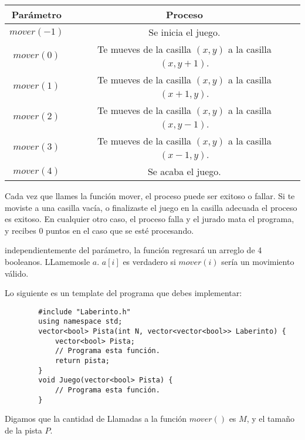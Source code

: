 \documentclass[12pt]{scrartcl}
\begin{document}
    \begin{center}
        \begin{tabular}{|c|c|}
            \hline
            {\bfseries Parámetro} & {\bfseries Proceso}\\
            \hline
             $mover(-1)$ & Se inicia el juego. \\
             \hline
             $mover(0)$ &  Te mueves de la casilla $(x, y)$ a la casilla $(x, y + 1)$. \\
             \hline
             $mover(1)$ & Te mueves de la casilla $(x, y)$ a la casilla $(x + 1, y)$.\\
             \hline
             $mover(2)$ & Te mueves de la casilla $(x, y)$ a la casilla $(x, y - 1)$.\\
             \hline
             $mover(3)$ & Te mueves de la casilla $(x, y)$ a la casilla $(x - 1, y)$.\\
             \hline
             $mover(4)$ & Se acaba el juego.\\
             \hline
        \end{tabular}
    \end{center}

    Cada vez que llames la función mover, el proceso puede ser exitoso o fallar.  Si te moviste a una casilla vacía, o finalizaste el juego en la casilla adecuada el proceso es exitoso. En cualquier otro caso, el proceso falla y el jurado mata el programa, y recibes 0 puntos en el caso que se esté procesando.
    
    
    independientemente del parámetro, la función regresará  un arreglo de 4 booleanos. LLamemosle $a$. $a[i]$ es verdadero si $mover(i)$ sería un movimiento válido. 
    
    Lo siguiente es un template del programa que debes implementar:
    
    \begin{verbatim}
        #include "Laberinto.h"
        using namespace std;
        vector<bool> Pista(int N, vector<vector<bool>> Laberinto) {
            vector<bool> Pista;
            // Programa esta función.
            return pista;
        }
        void Juego(vector<bool> Pista) {
            // Programa esta función.
        }
    \end{verbatim}


    Digamos que la cantidad de Llamadas a la función $mover()$ es $M$, y el tamaño de la pista $P$.
\end{document}
